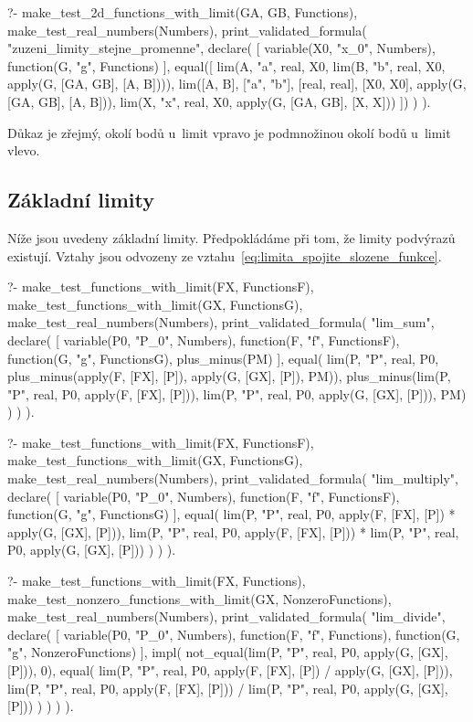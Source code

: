 \begin{prolog}
?-	make_test_2d_functions_with_limit(GA, GB, Functions),
	make_test_real_numbers(Numbers),
	print_validated_formula(
		"zuzeni_limity_stejne_promenne",
		declare(
			[
				variable(X0, "x_0", Numbers),
				function(G, "g", Functions)
			],
			equal([
				lim(A, "a", real, X0, lim(B, "b", real, X0, apply(G, [GA, GB], [A, B]))),
				lim([A, B], ["a", "b"], [real, real], [X0, X0], apply(G, [GA, GB], [A, B])),
				lim(X, "x", real, X0, apply(G, [GA, GB], [X, X]))
			])
		)
	).
\end{prolog}

Důkaz je zřejmý, okolí bodů u~limit vpravo je podmnožinou okolí bodů u~limit vlevo.

\subsection{Základní limity}

Níže jsou uvedeny základní limity. Předpokládáme při tom, že limity podvýrazů existují. Vztahy jsou odvozeny ze vztahu~\eqref{eq:limita_spojite_slozene_funkce}.

\begin{prolog}
?-	make_test_functions_with_limit(FX, FunctionsF),
	make_test_functions_with_limit(GX, FunctionsG),
	make_test_real_numbers(Numbers),
	print_validated_formula(
		"lim_sum",
		declare(
			[
				variable(P0, "P_0", Numbers),
				function(F, "f", FunctionsF),
				function(G, "g", FunctionsG),
				plus_minus(PM)
			],
			equal(
				lim(P, "P", real, P0, plus_minus(apply(F, [FX], [P]), apply(G, [GX], [P]), PM)),
				plus_minus(lim(P, "P", real, P0, apply(F, [FX], [P])), lim(P, "P", real, P0, apply(G, [GX], [P])), PM)
			)
		)
	).
\end{prolog}

\begin{prolog}
?-	make_test_functions_with_limit(FX, FunctionsF),
	make_test_functions_with_limit(GX, FunctionsG),
	make_test_real_numbers(Numbers),
	print_validated_formula(
		"lim_multiply",
		declare(
			[
				variable(P0, "P_0", Numbers),
				function(F, "f", FunctionsF),
				function(G, "g", FunctionsG)
			],
			equal(
				lim(P, "P", real, P0, apply(F, [FX], [P]) * apply(G, [GX], [P])),
				lim(P, "P", real, P0, apply(F, [FX], [P])) * lim(P, "P", real, P0, apply(G, [GX], [P]))
			)
		)
	).
\end{prolog}

\begin{prolog}
?-	make_test_functions_with_limit(FX, Functions),
	make_test_nonzero_functions_with_limit(GX, NonzeroFunctions),
	make_test_real_numbers(Numbers),
	print_validated_formula(
		"lim_divide",
		declare(
			[
				variable(P0, "P_0", Numbers),
				function(F, "f", Functions),
				function(G, "g", NonzeroFunctions)
			],
			impl(
				not_equal(lim(P, "P", real, P0, apply(G, [GX], [P])), 0),
				equal(
					lim(P, "P", real, P0, apply(F, [FX], [P]) / apply(G, [GX], [P])),
					lim(P, "P", real, P0, apply(F, [FX], [P])) / lim(P, "P", real, P0, apply(G, [GX], [P]))
				)
			)
		)
	).
\end{prolog}

